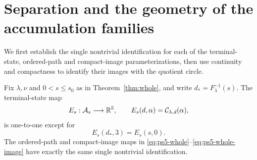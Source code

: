 \section{Separation and the geometry of the accumulation families}
\label{sec:accumulation-geometry}

We first establish the single nontrivial identification for each of the
terminal-state, ordered-path and compact-image parameterizations, then
use continuity and compactness to identify their images with the
quotient circle.

\begin{lemma}
\label{lem:terminal-separation}
Fix $\lambda,\nu$ and $0<s\le s_0$ as in
Theorem~\ref{thm:whole}, and write $d_*=F_\lambda^{-1}(s)$.
The terminal-state map
\[
 E_s:\mathcal A_s\longrightarrow\mathbb R^5,
 \qquad E_s(d,\alpha)=\mathcal C_{\lambda,d}(\alpha),
\]
is one-to-one except for
\[
 E_s(d_*,3)=E_s(s,0).
\]
The ordered-path and compact-image maps in
\eqref{eq:ps5-whole}--\eqref{eq:ps5-whole-image}
have exactly the same single nontrivial identification.
\end{lemma}

